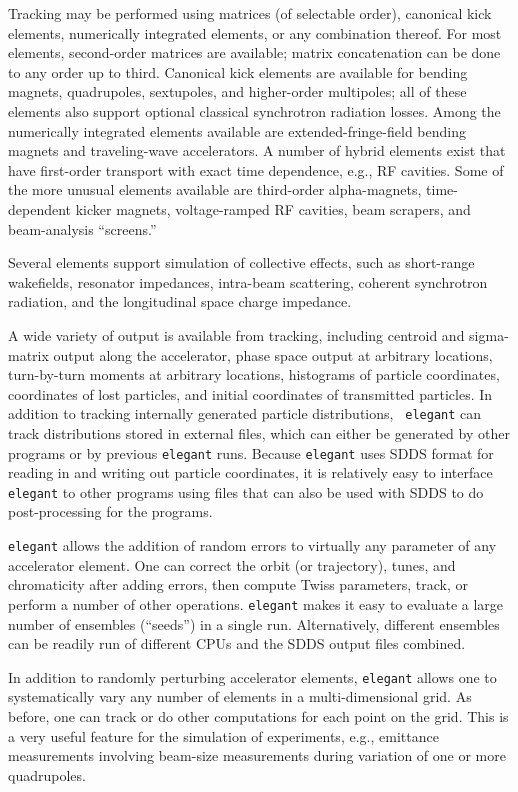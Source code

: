 \documentclass[11pt]{article}
\begin{document}
Tracking may be performed using matrices (of selectable order),
canonical kick elements, numerically integrated elements, or any
combination thereof.  For most elements, second-order matrices are
available; matrix concatenation can be done to any order up to third.
Canonical kick elements are available for bending magnets,
quadrupoles, sextupoles, and higher-order multipoles; all of these
elements also support optional classical synchrotron radiation losses.
Among the numerically integrated elements available are
extended-fringe-field bending magnets and traveling-wave accelerators.
A number of hybrid elements exist that have first-order transport with
exact time dependence, e.g., RF cavities.    Some of the more unusual
elements available are third-order
alpha-magnets\cite{Enge,Borland_thesis}, time-dependent kicker
magnets, voltage-ramped RF cavities, beam scrapers, and beam-analysis
``screens.''

Several elements support simulation of collective effects, such as
short-range wakefields, resonator impedances, intra-beam scattering,
coherent synchrotron radiation, and the longitudinal space charge
impedance. 

A wide variety of output is available from tracking, including
centroid and sigma-matrix output along the accelerator, phase space
output at arbitrary locations, turn-by-turn moments at arbitrary
locations, histograms of particle coordinates, coordinates of lost
particles, and initial coordinates of transmitted particles.  In
addition to tracking internally generated particle distributions, {\tt
elegant} can track distributions stored in external files, which can
either be generated by other programs or by previous {\tt elegant}
runs.  Because {\tt elegant} uses SDDS format for reading in and
writing out particle coordinates, it is relatively easy to interface
{\tt elegant} to other programs using files that can also be used with
SDDS to do post-processing for the programs.

{\tt elegant} allows the addition of random errors to virtually any
parameter of any accelerator element.  One can correct the orbit (or
trajectory), tunes, and chromaticity after adding errors, then compute
Twiss parameters, track, or perform a number of other operations.
{\tt elegant} makes it easy to evaluate a large number of ensembles (``seeds'')
in a single run.  Alternatively, different ensembles can be readily run
of different CPUs and the SDDS output files combined.

In addition to randomly perturbing accelerator elements, {\tt elegant}
allows one to systematically vary any number of elements in a
multi-dimensional grid.  As before, one can track or do other
computations for each point on the grid.  This is a very useful
feature for the simulation of experiments, e.g., emittance
measurements involving beam-size measurements during variation of one
or more quadrupoles\cite{Borland_PC}.
\end{document}
